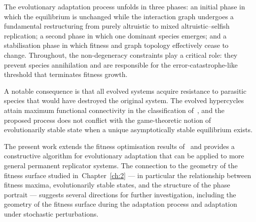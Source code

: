 \documentclass[12pt]{report}
\theoremstyle{definition}
\theoremstyle{remark}
\begin{document}
The evolutionary adaptation process unfolds in three phases: an initial phase in
which the equilibrium is unchanged while the interaction graph undergoes a
fundamental restructuring from purely altruistic to mixed altruistic--selfish
replication; a second phase in which one dominant species emerges; and a
stabilisation phase in which fitness and graph topology effectively cease to
change. Throughout, the non-degeneracy constraints play a critical role:
they prevent species annihilation and are responsible for the error-catastrophe-like
threshold that terminates fitness growth.

A notable consequence is that all evolved systems acquire resistance to parasitic
species that would have destroyed the original system. The evolved hypercycles
attain maximum functional connectivity in the classification of~\cite{c3:Eigen1982},
and the proposed process does not conflict with the game-theoretic notion of
evolutionarily stable state when a unique asymptotically stable equilibrium
exists.

The present work extends the fitness optimisation results of~\cite{c3:Drozhzhin2021}
and provides a constructive algorithm for evolutionary adaptation that can be
applied to more general permanent replicator systems. The connection to the
geometry of the fitness surface studied in~Chapter~\ref{ch:2} --- in particular
the relationship between fitness maxima, evolutionarily stable states, and the
structure of the phase portrait --- suggests several directions for further
investigation, including the geometry of the fitness surface during the
adaptation process and adaptation under stochastic perturbations.
\end{document}
